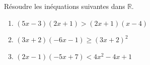 \begin{exo}{}
	Résoudre les inéquations suivantes dans $\mathbb{R}$.
	\begin{enumerate}[itemsep=2mm]
		\item $(5x - 3)(2x + 1) > (2x + 1)(x - 4)$
		\item $(3x + 2)(-6x - 1) \geqslant (3x + 2)^2$
		\item $(2x - 1)(-5x + 7) < 4x^2 - 4x + 1$
	\end{enumerate}
\end{exo}
